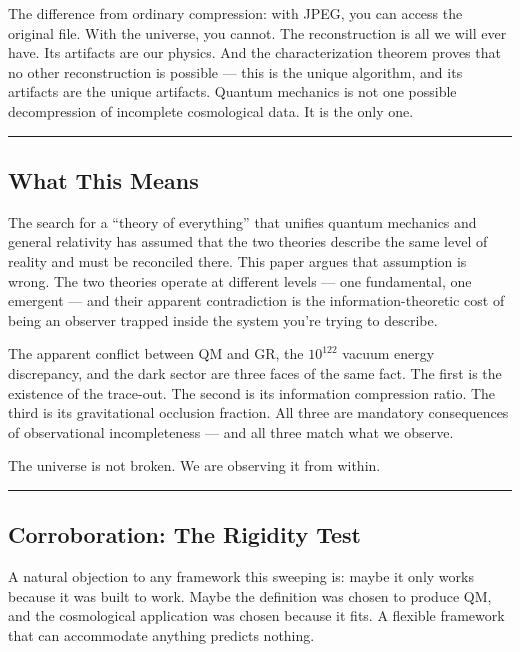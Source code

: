 \documentclass[
]{article}
\begin{document}
The difference from ordinary compression: with JPEG, you can access the
original file. With the universe, you cannot. The reconstruction is all
we will ever have. Its artifacts are our physics. And the
characterization theorem proves that no other reconstruction is possible
--- this is the unique algorithm, and its artifacts are the unique
artifacts. Quantum mechanics is not one possible decompression of
incomplete cosmological data. It is the only one.

\begin{center}\rule{0.5\linewidth}{0.5pt}\end{center}

\hypertarget{what-this-means}{%
\subsection{What This Means}\label{what-this-means}}

The search for a ``theory of everything'' that unifies quantum mechanics
and general relativity has assumed that the two theories describe the
same level of reality and must be reconciled there. This paper argues
that assumption is wrong. The two theories operate at different levels
--- one fundamental, one emergent --- and their apparent contradiction
is the information-theoretic cost of being an observer trapped inside
the system you're trying to describe.

The apparent conflict between QM and GR, the \(10^{122}\) vacuum energy
discrepancy, and the dark sector are three faces of the same fact. The
first is the existence of the trace-out. The second is its information
compression ratio. The third is its gravitational occlusion fraction.
All three are mandatory consequences of observational incompleteness ---
and all three match what we observe.

The universe is not broken. We are observing it from within.

\begin{center}\rule{0.5\linewidth}{0.5pt}\end{center}

\hypertarget{corroboration-the-rigidity-test}{%
\subsection{Corroboration: The Rigidity
Test}\label{corroboration-the-rigidity-test}}

A natural objection to any framework this sweeping is: maybe it only
works because it was built to work. Maybe the definition was chosen to
produce QM, and the cosmological application was chosen because it fits.
A flexible framework that can accommodate anything predicts nothing.
\end{document}
